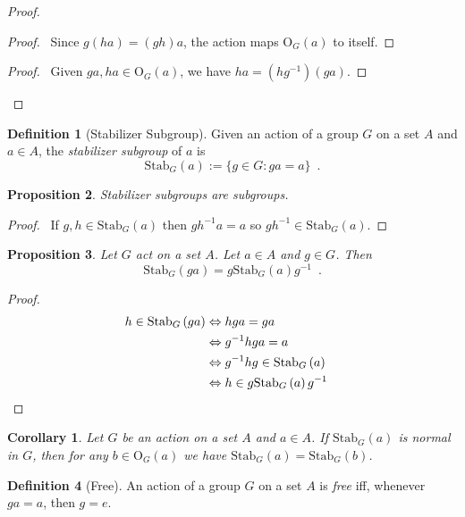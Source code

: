 \documentclass{book}
\let\qed\relax
\newtheorem{prop}{Proposition}[chapter]
\newtheorem{cor}{Corollary}[prop]
\theoremstyle{definition}
\newtheorem{df}[prop]{Definition}
\newcommand{\inv}[1]{\ensuremath{{#1}^{-1}}}
\newcommand{\Stab}[2]{\ensuremath{\mathrm{Stab}_{#1} \left( {#2} \right)}}
\begin{document}
\begin{proof}
\pf
{}
\begin{proof}
\pf\ Since $g(ha) = (gh)a$, the action maps $\mathrm{O}_G(a)$ to itself.
\end{proof}
\begin{proof}
\pf\ Given $ga, ha \in \mathrm{O}_G(a)$, we have $ha = (h\inv{g})(ga)$.
\end{proof}
\qed
\end{proof}

\begin{df}[Stabilizer Subgroup]
Given an action of a group $G$ on a set $A$ and $a \in A$, the \emph{stabilizer subgroup} of $a$ is
\[ \Stab{G}{a} := \{ g \in G : ga = a \} \enspace . \]
\end{df}

\begin{prop}
Stabilizer subgroups are subgroups.
\end{prop}

\begin{proof}
\pf\ If $g,h \in \Stab{G}{a}$ then $g \inv{h} a = a$ so $g \inv{h} \in \Stab{G}{a}$. \qed
\end{proof}

\begin{prop}
Let $G$ act on a set $A$. Let $a \in A$ and $g \in G$. Then
\[ \Stab{G}{ga} = g \Stab{G}{a} \inv{g} \enspace . \]
\end{prop}

\begin{proof}
\pf
\begin{align*}
h \in \Stab{G}{ga} & \Leftrightarrow hga = ga \\
& \Leftrightarrow \inv{g}hga = a \\
& \Leftrightarrow \inv{g}hg \in \Stab{G}{a} \\
& \Leftrightarrow h \in g \Stab{G}{a} \inv{g} & \qed
\end{align*}
\end{proof}

\begin{cor}
Let $G$ be an action on a set $A$ and $a \in A$. If $\Stab{G}{a}$ is normal in $G$, then for any $b \in \mathrm{O}_G(a)$ we have $\Stab{G}{a} = \Stab{G}{b}$.
\end{cor}

\begin{df}[Free]
An action of a group $G$ on a set $A$ is \emph{free} iff, whenever $ga = a$, then $g = e$.
\end{df}
\end{document}
